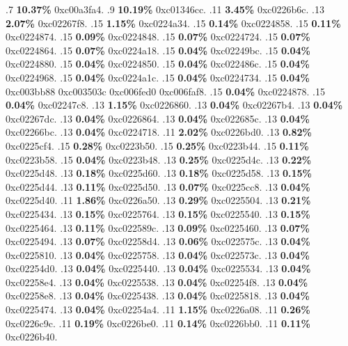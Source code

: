 \begin{profile}
{.7 \textbf{10.37\%} 0xc00a3fa4. 
.9 \textbf{10.19\%} 0xc01346cc. 
.11 \textbf{3.45\%} 0xc0226b6c. 
.13 \textbf{2.07\%} 0xc02267f8. 
.15 \textbf{1.15\%} 0xc0224a34. 
.15 \textbf{0.14\%} 0xc0224858. 
.15 \textbf{0.11\%} 0xc0224874. 
.15 \textbf{0.09\%} 0xc0224848. 
.15 \textbf{0.07\%} 0xc0224724. 
.15 \textbf{0.07\%} 0xc0224864. 
.15 \textbf{0.07\%} 0xc0224a18. 
.15 \textbf{0.04\%} 0xc02249bc. 
.15 \textbf{0.04\%} 0xc0224880. 
.15 \textbf{0.04\%} 0xc0224850. 
.15 \textbf{0.04\%} 0xc022486c. 
.15 \textbf{0.04\%} 0xc0224968. 
.15 \textbf{0.04\%} 0xc0224a1c. 
.15 \textbf{0.04\%} 0xc0224734. 
.15 \textbf{0.04\%} 0xc003bb88\newline {} 0xc003503c\newline {} 0xc006fed0\newline {} 0xc006faf8. 
.15 \textbf{0.04\%} 0xc0224878. 
.15 \textbf{0.04\%} 0xc02247c8. 
.13 \textbf{1.15\%} 0xc0226860. 
.13 \textbf{0.04\%} 0xc02267b4. 
.13 \textbf{0.04\%} 0xc02267dc. 
.13 \textbf{0.04\%} 0xc0226864. 
.13 \textbf{0.04\%} 0xc022685c. 
.13 \textbf{0.04\%} 0xc02266bc. 
.13 \textbf{0.04\%} 0xc0224718. 
.11 \textbf{2.02\%} 0xc0226bd0. 
.13 \textbf{0.82\%} 0xc0225cf4. 
.15 \textbf{0.28\%} 0xc0223b50. 
.15 \textbf{0.25\%} 0xc0223b44. 
.15 \textbf{0.11\%} 0xc0223b58. 
.15 \textbf{0.04\%} 0xc0223b48. 
.13 \textbf{0.25\%} 0xc0225d4c. 
.13 \textbf{0.22\%} 0xc0225d48. 
.13 \textbf{0.18\%} 0xc0225d60. 
.13 \textbf{0.18\%} 0xc0225d58. 
.13 \textbf{0.15\%} 0xc0225d44. 
.13 \textbf{0.11\%} 0xc0225d50. 
.13 \textbf{0.07\%} 0xc0225cc8. 
.13 \textbf{0.04\%} 0xc0225d40. 
.11 \textbf{1.86\%} 0xc0226a50. 
.13 \textbf{0.29\%} 0xc0225504. 
.13 \textbf{0.21\%} 0xc0225434. 
.13 \textbf{0.15\%} 0xc0225764. 
.13 \textbf{0.15\%} 0xc0225540. 
.13 \textbf{0.15\%} 0xc0225464. 
.13 \textbf{0.11\%} 0xc022589c. 
.13 \textbf{0.09\%} 0xc0225460. 
.13 \textbf{0.07\%} 0xc0225494. 
.13 \textbf{0.07\%} 0xc02258d4. 
.13 \textbf{0.06\%} 0xc022575c. 
.13 \textbf{0.04\%} 0xc0225810. 
.13 \textbf{0.04\%} 0xc0225758. 
.13 \textbf{0.04\%} 0xc022573c. 
.13 \textbf{0.04\%} 0xc02254d0. 
.13 \textbf{0.04\%} 0xc0225440. 
.13 \textbf{0.04\%} 0xc0225534. 
.13 \textbf{0.04\%} 0xc02258e4. 
.13 \textbf{0.04\%} 0xc0225538. 
.13 \textbf{0.04\%} 0xc02254f8. 
.13 \textbf{0.04\%} 0xc02258e8. 
.13 \textbf{0.04\%} 0xc0225438. 
.13 \textbf{0.04\%} 0xc0225818. 
.13 \textbf{0.04\%} 0xc0225474. 
.13 \textbf{0.04\%} 0xc02254a4. 
.11 \textbf{1.15\%} 0xc0226a08. 
.11 \textbf{0.26\%} 0xc0226c9c. 
.11 \textbf{0.19\%} 0xc0226be0. 
.11 \textbf{0.14\%} 0xc0226bb0. 
.11 \textbf{0.11\%} 0xc0226b40. 
}
\end{profile}
